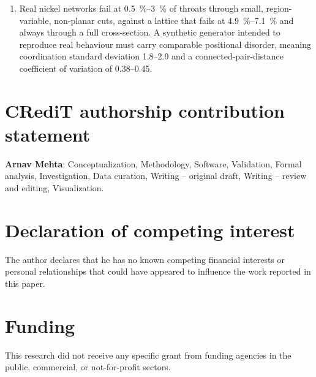 \documentclass[5p,times,twocolumn]{elsarticle}
\begin{document}
\begin{enumerate}
  The coarse anode carries the smallest minimum cut of the three, 2.8 times
  below fine and 4.1 times below medium on class means, and is the best
  retainer in service. The scope of that statement is the operator, not
  degradation in general, because a rule with a different spatial bias could rank
them
  differently, and none was tested.
\item Real nickel networks fail at \SIrange{0.5}{3}{\percent} of throats
  through small, region-variable, non-planar cuts, against a lattice that
  fails at \SIrange{4.9}{7.1}{\percent} and always through a full
  cross-section. A synthetic generator intended to reproduce real behaviour
  must carry comparable positional disorder, meaning coordination standard
deviation
  \numrange{1.8}{2.9} and a connected-pair-distance coefficient of variation
  of \numrange{0.38}{0.45}.
\end{enumerate}

\section*{CRediT authorship contribution statement}

\textbf{Arnav Mehta}: Conceptualization, Methodology, Software, Validation,
Formal analysis, Investigation, Data curation, Writing -- original draft,
Writing -- review and editing, Visualization.

\section*{Declaration of competing interest}

The author declares that he has no known competing financial interests or
personal relationships that could have appeared to influence the work reported
in this paper.

\section*{Funding}

This research did not receive any specific grant from funding agencies in the
public, commercial, or not-for-profit sectors.
\end{document}
